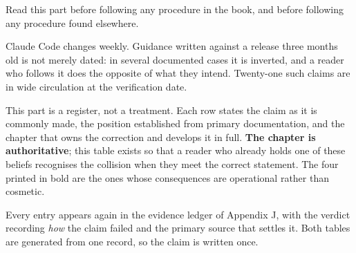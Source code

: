 \documentclass[11pt,a4paper,twoside,openany]{book}
\begin{document}
Read this part before following any procedure in the book, and before following any procedure found elsewhere.


Claude Code changes weekly. Guidance written against a release three months old is not merely dated: in several documented cases it is inverted, and a reader who follows it does the opposite of what they intend. Twenty-one such claims are in wide circulation at the verification date.


This part is a register, not a treatment. Each row states the claim as it is commonly made, the position established from primary documentation, and the chapter that owns the correction and develops it in full. \textbf{The chapter is authoritative}; this table exists so that a reader who already holds one of these beliefs recognises the collision when they meet the correct statement. The four printed in bold are the ones whose consequences are operational rather than cosmetic.


Every entry appears again in the evidence ledger of Appendix J, with the verdict recording \emph{how} the claim failed and the primary source that settles it. Both tables are generated from one record, so the claim is written once.
\end{document}
